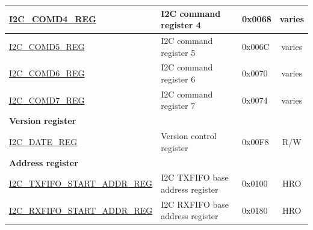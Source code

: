 \begin{longtable}{ | p{5.8cm} | p{6.8cm} | p{1.3cm} | c | }
\hyperref[regdesc:I2CCOMD4REG]{I2C\_COMD4\_REG} & I2C command register 4 & 0x0068 & varies \\ \hline
\hyperref[regdesc:I2CCOMD5REG]{I2C\_COMD5\_REG} & I2C command register 5 & 0x006C & varies \\ \hline
\hyperref[regdesc:I2CCOMD6REG]{I2C\_COMD6\_REG} & I2C command register 6 & 0x0070 & varies \\ \hline
\hyperref[regdesc:I2CCOMD7REG]{I2C\_COMD7\_REG} & I2C command register 7 & 0x0074 & varies \\ \hline
\multicolumn{4}{|l|}{\textbf{Version register}} \\ \hline
\hyperref[regdesc:I2CDATEREG]{I2C\_DATE\_REG} & Version control register & 0x00F8 & R/W \\ \hline
\multicolumn{4}{|l|}{\textbf{Address register}} \\ \hline
\hyperref[regdesc:I2CTXFIFOSTARTADDRREG]{I2C\_TXFIFO\_START\_ADDR\_REG} & I2C TXFIFO base address register & 0x0100 & HRO \\ \hline
\hyperref[regdesc:I2CRXFIFOSTARTADDRREG]{I2C\_RXFIFO\_START\_ADDR\_REG} & I2C RXFIFO base address register & 0x0180 & HRO \\ \hline
\end{longtable}
